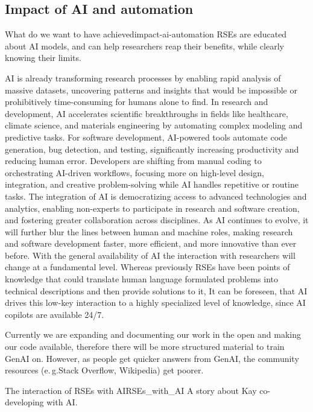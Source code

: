 \documentclass{eceasst}
\newcommand{\eg}{e.\,g.}
\begin{document}
\subsection{Impact of AI and automation}
\begin{whatis}{What do we want to have achieved}{impact-ai-automation}
RSEs are educated about AI models, and can help researchers reap their benefits, while
clearly knowing their limits.
\end{whatis}
AI is already transforming research processes by enabling rapid analysis of massive datasets, uncovering patterns and insights that would be impossible or prohibitively time-consuming for humans alone to find.
In research and development, AI accelerates scientific breakthroughs in fields like healthcare, climate science, and materials engineering by automating complex modeling and predictive tasks.
For software development, AI-powered tools automate code generation, bug detection, and testing, significantly increasing productivity and reducing human error.
Developers are shifting from manual coding to orchestrating AI-driven workflows, focusing more on high-level design, integration, and creative problem-solving while AI handles repetitive or routine tasks.
The integration of AI is democratizing access to advanced technologies and analytics, enabling non-experts to participate in research and software creation, and fostering greater collaboration across disciplines.
As AI continues to evolve, it will further blur the lines between human and machine roles, making research and software development faster, more efficient, and more innovative than ever before.
With the general availability of AI the interaction with researchers will change at a fundamental level.
Whereas previously RSEs have been points of knowledge that could translate human language formulated problems into technical descriptions and then provide solutions to it,
It can be foreseen, that AI drives this low-key interaction to a highly specialized level of knowledge,
since AI copilots are available 24/7.

Currently we are expanding and documenting our work in the open and making our code available,
therefore there will be more structured material to train GenAI on.
However, as people get quicker answers from GenAI, the community resources (\eg Stack Overflow, Wikipedia)
get poorer.

\begin{story}{The interaction of RSEs with AI}{RSEs_with_AI}
A story about Kay co-developing with AI.
\end{story}
\end{document}
